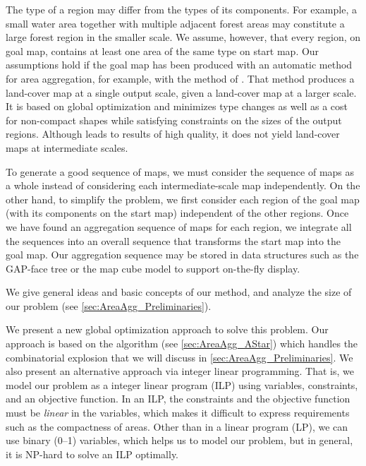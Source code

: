 The type of a region may differ from the types of its 
components. 
For example, a small water area together with 
multiple adjacent forest areas may constitute 
a large forest region in the smaller scale.
We assume, however, that every region, on goal map, 
contains at least one area of the same type on start map.
Our assumptions hold if the goal map has been produced 
with an automatic method for area aggregation, 
for example, with the method of \citet{HaunertWolff2010AreaAgg}.
That method produces a land-cover map at a single output scale, 
given a land-cover map at a larger scale.
It is based on global optimization and minimizes 
type changes as well as a cost for non-compact shapes 
while satisfying constraints on the sizes of the output regions.
Although \textcite{HaunertWolff2010AreaAgg}
leads to results of high quality, 
it does not yield land-cover maps at intermediate scales.


To generate a good sequence of maps, 
we must consider the sequence of maps as a whole 
instead of considering each intermediate-scale map independently.
On the other hand, to simplify the problem,
we first consider each region of the goal map 
(with its components on the start map) 
independent of the other regions.
Once we have found an aggregation sequence of maps for each region, 
we integrate all the sequences into an overall sequence 
that transforms the start map into the goal map. 
Our aggregation sequence may be stored in data structures
such as the GAP-face tree \citep{vanOosterom2005} 
or the map cube model \citep{Timpf1998} 
to support on-the-fly display.


We give general ideas and basic concepts of our method, 
and analyze the size of our problem (see 
\sect\ref{sec:AreaAgg_Preliminaries}).

We present a new global optimization approach to solve this 
problem. 
Our approach is based on the \Astar algorithm 
(see \sect\ref{sec:AreaAgg_AStar}) 
which handles the combinatorial explosion that 
we will discuss in \sect\ref{sec:AreaAgg_Preliminaries}.
We also present an alternative approach via integer linear
programming.  That is, we model our problem as a integer linear
program (ILP) using variables, constraints, and an objective
function.  In an ILP, the constraints and the objective function must
be \emph{linear} in the variables, which makes it difficult to express
requirements such as the compactness of areas.  Other than in a linear
program (LP), we can use binary (0--1) variables, which helps us to
model our problem, but in general, it is NP-hard to solve an ILP
optimally.  

